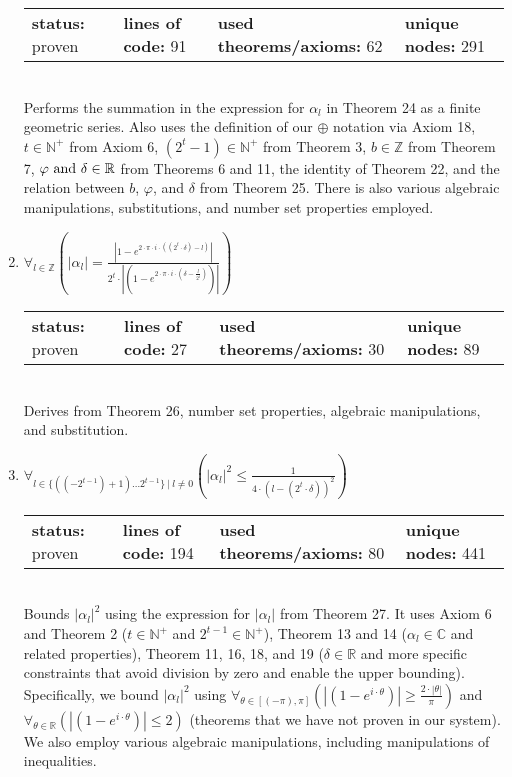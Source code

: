 \documentclass{article}[12pt]
\begin{document}
\begin{enumerate}
  \begin{tabular}{l | l | l | l}
    \textbf{status:} proven & \textbf{lines of code:} 91 & \textbf{used theorems/axioms:} 62 & \textbf{unique nodes:} 291
  \end{tabular} \hfill \\
  Performs the summation in the expression for $\alpha_l$ in Theorem 24 as a finite geometric series.  Also uses the definition of our $\oplus$ notation via Axiom 18, $t \in \mathbb{N}^+$ from Axiom 6, $(2^t - 1) \in \mathbb{N}^+$ from Theorem 3, $b \in \mathbb{Z}$ from Theorem 7, $\varphi~{\rm and}~\delta \in \mathbb{R}$ from Theorems 6 and 11, the identity of Theorem 22, and the relation between $b$, $\varphi$, and $\delta$ from Theorem 25.  There is also various algebraic manipulations, substitutions, and number set properties employed.
\item $\forall_{l \in \mathbb{Z}} \left(\left|\alpha_{l}\right| = \frac{\left|1 - e^{2 \cdot \pi \cdot i \cdot \left(\left(2^{t} \cdot \delta\right) - l\right)}\right|}{2^{t} \cdot \left|\left(1 - e^{2 \cdot \pi \cdot i \cdot \left(\delta - \frac{l}{2^{t}}\right)}\right)\right|}\right)$ \hfill \\
  \begin{tabular}{l | l | l | l}
    \textbf{status:} proven & \textbf{lines of code:} 27 & \textbf{used theorems/axioms:} 30 & \textbf{unique nodes:} 89 
  \end{tabular} \hfill \\
Derives from Theorem 26, number set properties, algebraic manipulations, and substitution.
\item $\forall_{l \in \{\left(\left(-2^{t - 1}\right) + 1\right)\ldots 2^{t - 1}\}~|~l \neq 0} \left(\left|\alpha_{l}\right|^{2} \leq \frac{1}{4 \cdot \left(l - \left(2^{t} \cdot \delta\right)\right)^{2}}\right)$ \hfill \\
  \begin{tabular}{l | l | l | l}
    \textbf{status:} proven & \textbf{lines of code:} 194 & \textbf{used theorems/axioms:} 80 & \textbf{unique nodes:} 441
  \end{tabular} \hfill \\
  Bounds $\lvert \alpha_l \rvert^2$ using the expression for $\lvert \alpha_l \rvert$ from Theorem 27.  It uses Axiom 6 and Theorem 2 ($t \in \mathbb{N}^+$ and $2^{t-1} \in \mathbb{N}^+$), Theorem 13 and 14 ($\alpha_l \in \mathbb{C}$ and related properties), Theorem 11, 16, 18, and 19 ($\delta \in \mathbb{R}$ and more specific constraints that avoid division by zero and enable the upper bounding).  Specifically, we bound $\lvert \alpha_l \rvert^2$ using $\forall_{\theta \in \left[\left(-\pi\right),\pi\right]} \left(\left|\left(1 - e^{i \cdot \theta}\right)\right| \geq \frac{2 \cdot \left|\theta\right|}{\pi}\right)$ and $\forall_{\theta \in \mathbb{R}} \left(\left|\left(1 - e^{i \cdot \theta}\right)\right| \leq 2\right)$ (theorems that we have not proven in our system).  We also employ various algebraic manipulations, including manipulations of inequalities.

\end{enumerate}
\end{document}
